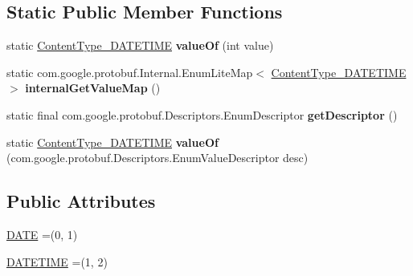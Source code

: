 \subsection*{Static Public Member Functions}
\begin{DoxyCompactItemize}
\item 
\mbox{\label{enumcom_1_1mysql_1_1cj_1_1x_1_1protobuf_1_1_mysqlx_resultset_1_1_content_type___d_a_t_e_t_i_m_e_ac08602ab33879d1d9bb39ffbd575f147}} 
static \mbox{\hyperlink{enumcom_1_1mysql_1_1cj_1_1x_1_1protobuf_1_1_mysqlx_resultset_1_1_content_type___d_a_t_e_t_i_m_e}{Content\+Type\+\_\+\+D\+A\+T\+E\+T\+I\+ME}} {\bfseries value\+Of} (int value)
\item 
\mbox{\label{enumcom_1_1mysql_1_1cj_1_1x_1_1protobuf_1_1_mysqlx_resultset_1_1_content_type___d_a_t_e_t_i_m_e_aef83d59e03c578e698bfc93a03611d8a}} 
static com.\+google.\+protobuf.\+Internal.\+Enum\+Lite\+Map$<$ \mbox{\hyperlink{enumcom_1_1mysql_1_1cj_1_1x_1_1protobuf_1_1_mysqlx_resultset_1_1_content_type___d_a_t_e_t_i_m_e}{Content\+Type\+\_\+\+D\+A\+T\+E\+T\+I\+ME}} $>$ {\bfseries internal\+Get\+Value\+Map} ()
\item 
\mbox{\label{enumcom_1_1mysql_1_1cj_1_1x_1_1protobuf_1_1_mysqlx_resultset_1_1_content_type___d_a_t_e_t_i_m_e_ae7f5888be5a77359eed504dbcb75bbc9}} 
static final com.\+google.\+protobuf.\+Descriptors.\+Enum\+Descriptor {\bfseries get\+Descriptor} ()
\item 
\mbox{\label{enumcom_1_1mysql_1_1cj_1_1x_1_1protobuf_1_1_mysqlx_resultset_1_1_content_type___d_a_t_e_t_i_m_e_ae4c84a62071131f315a3b74691fbebcc}} 
static \mbox{\hyperlink{enumcom_1_1mysql_1_1cj_1_1x_1_1protobuf_1_1_mysqlx_resultset_1_1_content_type___d_a_t_e_t_i_m_e}{Content\+Type\+\_\+\+D\+A\+T\+E\+T\+I\+ME}} {\bfseries value\+Of} (com.\+google.\+protobuf.\+Descriptors.\+Enum\+Value\+Descriptor desc)
\end{DoxyCompactItemize}
\subsection*{Public Attributes}
\begin{DoxyCompactItemize}
\item 
\mbox{\hyperlink{enumcom_1_1mysql_1_1cj_1_1x_1_1protobuf_1_1_mysqlx_resultset_1_1_content_type___d_a_t_e_t_i_m_e_a30212d00ab311043597150438c4c0c6d}{D\+A\+TE}} =(0, 1)
\item 
\mbox{\hyperlink{enumcom_1_1mysql_1_1cj_1_1x_1_1protobuf_1_1_mysqlx_resultset_1_1_content_type___d_a_t_e_t_i_m_e_a2165b4ca844987956db7dafc8e8e24f5}{D\+A\+T\+E\+T\+I\+ME}} =(1, 2)
\end{DoxyCompactItemize}
